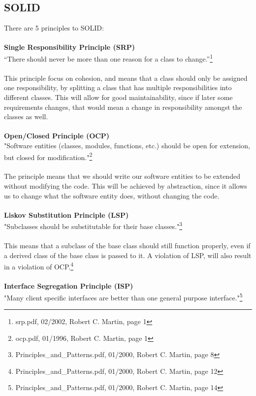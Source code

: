 \subsection{SOLID}
\label{appendix:SOLID}
There are 5 principles to SOLID:
\\
\\
\textbf{Single Responsibility Principle (SRP)}
\\
 “There should never be more than one reason for a class to change.”\footnote{srp.pdf, 02/2002, Robert C. Martin, page 1}
\\
\\
This principle focus on cohesion, and means that a class should only be assigned one responsibility, by splitting a class that has multiple responsibilities into different classes. This will allow for good maintainability, since if later some requirements changes, that would mean a change in responsibility amongst the classes as well.
\\
\\
\textbf{Open/Closed Principle (OCP)}
\\
"Software entities (classes, modules, functions, etc.) should be open for extension, but closed for modification."\footnote{ocp.pdf, 01/1996, Robert C. Martin, page 1}
\\
\\
The principle means that we should write our software entities to be extended without modifying the code. This will be achieved by abstraction, since it allows us to change what the software entity does, without changing the code.
\\
\\
\textbf{Liskov Substitution Principle (LSP)}
\\
"Subclasses should be substitutable for their base classes."\footnote{Principles\_and\_Patterns.pdf, 01/2000, Robert C. Martin, page 8}
\\
\\
This means that a subclass of the base class should still function properly, even if a derived class of the base class is passed to it. A violation of LSP, will also result in a violation of OCP.\footnote{Principles\_and\_Patterns.pdf, 01/2000, Robert C. Martin, page 12}
\\
\\
\textbf{Interface Segregation Principle (ISP)}
\\
"Many client specific interfaces are better than one general purpose interface."\footnote{Principles\_and\_Patterns.pdf, 01/2000, Robert C. Martin, page 14}
